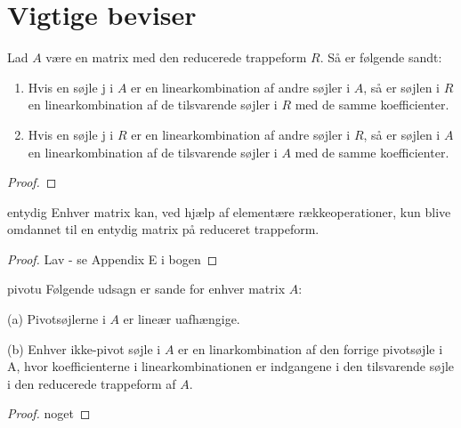 \chapter{Vigtige beviser}

\begin{thm}{}{}
Lad $A$ være en matrix med den reducerede trappeform $R$. Så er følgende sandt:
\begin{enumerate}[label=(\alph*)]
\item  Hvis en søjle j i $A$ er en linearkombination  af andre søjler i $A$, så er søjlen i $R$ en linearkombination af de tilsvarende søjler i $R$ med de samme koefficienter.
\item  Hvis en søjle j i $R$ er en linearkombination  af andre søjler i $R$, så er søjlen i $A$ en linearkombination af de tilsvarende søjler i $A$ med de samme koefficienter.
\end{enumerate}
\end{thm}%
\begin{proof}

\end{proof}


\begin{thm}{}{entydig}
Enhver matrix kan, ved hjælp af elementære rækkeoperationer, kun blive omdannet til en entydig matrix på reduceret trappeform.
\end{thm}
%
\begin{proof}
Lav - se Appendix E i bogen
\end{proof}



\begin{thm}{}{pivotu}
Følgende udsagn er sande for enhver matrix $A$: 
\itemize 
\item (a) Pivotsøjlerne i $A$ er lineær uafhængige. 
\item (b) Enhver ikke-pivot søjle i $A$ er en linarkombination af den forrige pivotsøjle i A, hvor koefficienterne i linearkombinationen er indgangene i den tilsvarende søjle i den reducerede trappeform af $A$. 
\end{thm}
\begin{proof}
noget
\end{proof}